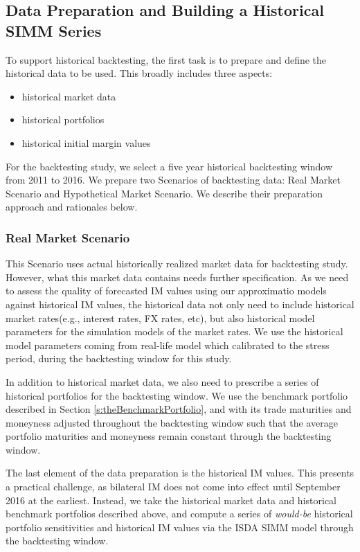 \documentclass[preprint,12pt]{elsarticle}
\begin{document}
\subsection{Data Preparation and Building a Historical SIMM Series}\label{s:dataPrepare}
To support historical backtesting, the first task is to prepare and define the historical data to be used. This broadly includes three aspects:
\begin{itemize}
\item historical market data
\item historical portfolios
\item historical initial margin values
\end{itemize}

For the backtesting study, we select a five year historical backtesting window from 2011 to 2016. We prepare two Scenarios of backtesting data: Real Market Scenario and Hypothetical Market Scenario. We describe their preparation approach and rationales below.

\subsubsection{Real Market Scenario}

This Scenario uses actual historically realized market data for backtesting study. However, what this market data contains needs further specification. As we need to assess the quality of forecasted IM values using our approximatio models against historical IM values, the historical data not only need to include historical market rates(e.g., interest rates, FX rates, etc), but also historical model parameters for the simulation models of the market rates. We use the historical model parameters coming from real-life model which calibrated to the stress period, during the backtesting window for this study.

In addition to historical market data, we also need to prescribe a series of historical portfolios for the backtesting window. We use the benchmark portfolio described in Section \ref{s:theBenchmarkPortfolio}, and with its trade maturities and moneyness adjusted throughout the backtesting window such that the average portfolio maturities and moneyness remain constant through the backtesting window.

The last element of the data preparation is the historical IM values. This presents a practical challenge, as bilateral IM does not come into effect until September 2016 at the earliest. Instead, we take the historical market data and historical benchmark portfolios described above, and compute a series of \emph{would-be} historical portfolio sensitivities and historical IM values  via the ISDA SIMM model through the backtesting window.
\end{document}
